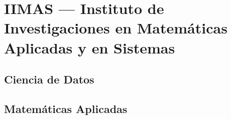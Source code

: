 \section{IIMAS --- Instituto de Investigaciones en Matemáticas Aplicadas y en Sistemas}

\subsection{Ciencia de Datos}

\subsection{Matemáticas Aplicadas}
